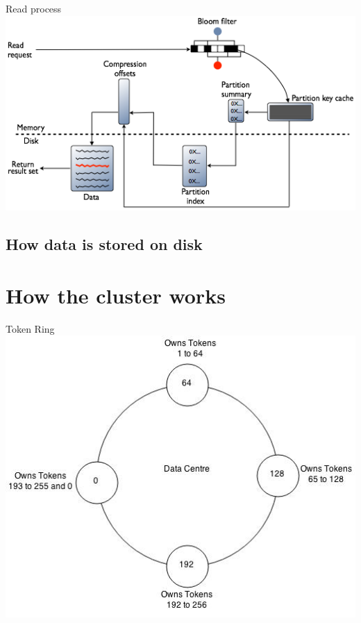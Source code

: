 \documentclass[
  10pt
]{beamer}
\begin{document}
\begin{frame}{Read process}
  \includegraphics[width=\textwidth]{resources/local_read.png}
\end{frame}

\subsection{How data is stored on disk}

\section{How the cluster works}  %

\begin{frame}{Token Ring}
  \includegraphics[width=1.0\textwidth]{resources/token_ring.jpg}
\end{frame}
\end{document}
